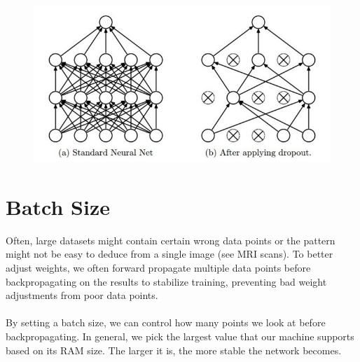 \documentclass{article}
\begin{document}
    \begin{figure}
    \centering
    \includegraphics[scale=0.4]{dropout.jpg}
    \end{figure}

\section{Batch Size}
    Often, large datasets might contain certain wrong data points or the pattern might not be easy to deduce from a single image (see MRI scans). To better adjust weights, we often forward propagate multiple data points before backpropagating on the results to stabilize training, preventing bad weight adjustments from poor data points.
    \\
    \\
    By setting a batch size, we can control how many points we look at before backpropagating. In general, we pick the largest value that our machine supports based on its RAM size. The larger it is, the more stable the network becomes.
\end{document}
